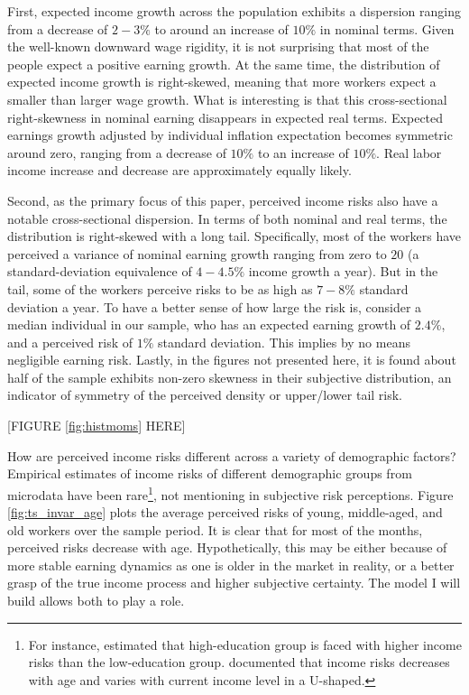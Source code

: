 \documentclass[12pt,notitlepage,onecolumn,aps,pra]{article}
\begin{document}
First, expected income growth across the population exhibits a
dispersion ranging from a decrease of \(2-3\%\) to around an increase of
\(10\%\) in nominal terms. Given the well-known downward wage rigidity,
it is not surprising that most of the people expect a positive earning
growth. At the same time, the distribution of expected income growth is
right-skewed, meaning that more workers expect a smaller than larger
wage growth. What is interesting is that this cross-sectional
right-skewness in nominal earning disappears in expected real terms.
Expected earnings growth adjusted by individual inflation expectation
becomes symmetric around zero, ranging from a decrease of \(10\%\) to an
increase of \(10\%\). Real labor income increase and decrease are
approximately equally likely.

Second, as the primary focus of this paper, perceived income risks also
have a notable cross-sectional dispersion. In terms of both nominal and
real terms, the distribution is right-skewed with a long tail.
Specifically, most of the workers have perceived a variance of nominal
earning growth ranging from zero to \(20\) (a standard-deviation
equivalence of \(4-4.5\%\) income growth a year). But in the tail, some
of the workers perceive risks to be as high as \(7-8\%\) standard
deviation a year. To have a better sense of how large the risk is,
consider a median individual in our sample, who has an expected earning
growth of \(2.4\%\), and a perceived risk of \(1\%\) standard deviation.
This implies by no means negligible earning risk. Lastly, in the figures
not presented here, it is found about half of the sample exhibits
non-zero skewness in their subjective distribution, an indicator of
symmetry of the perceived density or upper/lower tail risk.

{[}FIGURE \ref{fig:histmoms} HERE{]}

How are perceived income risks different across a variety of demographic
factors? Empirical estimates of income risks of different demographic
groups from microdata have been
rare\footnote{For instance, \cite{meghir2004income} estimated that high-education group is faced with higher income risks than the low-education group.  \cite{bloom2018great} documented that income risks decreases with age and varies with current income level in a U-shaped.},
not mentioning in subjective risk perceptions. Figure
\ref{fig:ts_invar_age} plots the average perceived risks of young,
middle-aged, and old workers over the sample period. It is clear that
for most of the months, perceived risks decrease with age.
Hypothetically, this may be either because of more stable earning
dynamics as one is older in the market in reality, or a better grasp of
the true income process and higher subjective certainty. The model I
will build allows both to play a role.
\end{document}
